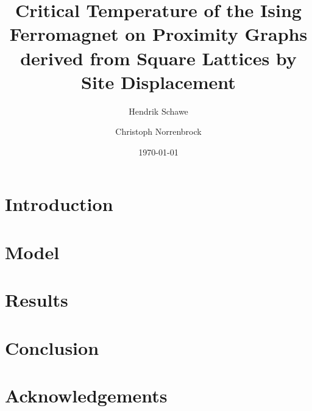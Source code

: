 \documentclass[prb,twocolumn,groupedaddress,showpacs,showkeys,amsmath,amssymb,floatfix]{revtex4-1}
\begin{document}
    \title{Critical Temperature of the Ising Ferromagnet on Proximity Graphs derived from Square Lattices by Site Displacement}
    \author{Hendrik Schawe}
    \author{Christoph Norrenbrock}
    \date{\today}

    \begin{abstract}
    
    \end{abstract}

    \maketitle

    \section{Introduction}
        

    \section{Model}
        

    \section{Results}
        

    \section{Conclusion}
        

    \section{Acknowledgements}
        

    
\end{document}
